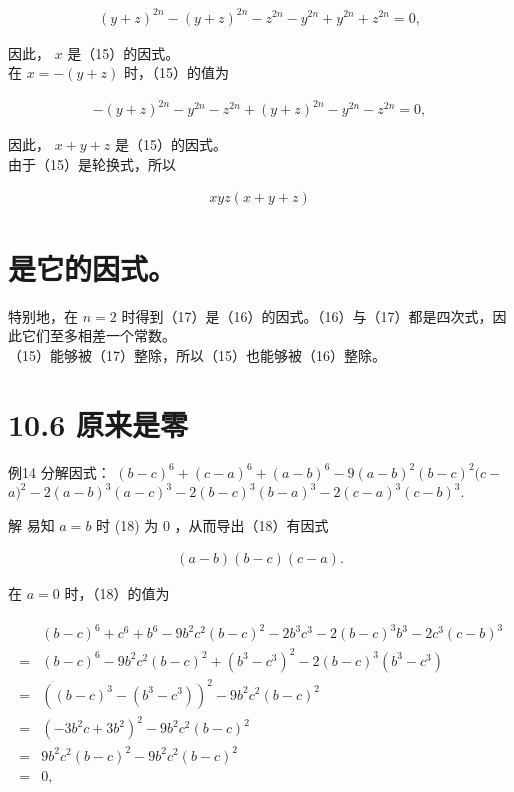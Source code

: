 \documentclass[10pt]{article}
\begin{document}
\begin{align*}
(y+z)^{2 n}-(y+z)^{2 n}-z^{2 n}-y^{2 n}+y^{2 n}+z^{2 n}=0,
\end{align*}

因此， $x$ 是（15）的因式。\\
在 $x=-(y+z)$ 时，（15）的值为

\begin{align*}
-(y+z)^{2 n}-y^{2 n}-z^{2 n}+(y+z)^{2 n}-y^{2 n}-z^{2 n}=0,
\end{align*}

因此， $x+y+z$ 是（15）的因式。\\
由于（15）是轮换式，所以

\begin{align*}
x y z(x+y+z) \tag{17}
\end{align*}

\section*{是它的因式。}
特别地，在 $n=2$ 时得到（17）是（16）的因式。（16）与（17）都是四次式，因此它们至多相差一个常数。\\
（15）能够被（17）整除，所以（15）也能够被（16）整除。

\section*{10.6 原来是零}
例14 分解因式： $(b-c)^{6}+(c-a)^{6}+(a-b)^{6}-9(a-b)^{2}(b-c)^{2}(c-$ $a)^{2}-2(a-b)^{3}(a-c)^{3}-2(b-c)^{3}(b-a)^{3}-2(c-a)^{3}(c-b)^{3}$.

解 易知 $a=b$ 时 (18) 为 0 ，从而导出（18）有因式

\begin{align*}
(a-b)(b-c)(c-a) .
\end{align*}

在 $a=0$ 时，（18）的值为

\begin{align*}
\begin{aligned}
& (b-c)^{6}+c^{6}+b^{6}-9 b^{2} c^{2}(b-c)^{2}-2 b^{3} c^{3}-2(b-c)^{3} b^{3}-2 c^{3}(c-b)^{3} \\
= & (b-c)^{6}-9 b^{2} c^{2}(b-c)^{2}+\left(b^{3}-c^{3}\right)^{2}-2(b-c)^{3}\left(b^{3}-c^{3}\right) \\
= & \left((b-c)^{3}-\left(b^{3}-c^{3}\right)\right)^{2}-9 b^{2} c^{2}(b-c)^{2} \\
= & \left(-3 b^{2} c+3 b^{2}\right)^{2}-9 b^{2} c^{2}(b-c)^{2} \\
= & 9 b^{2} c^{2}(b-c)^{2}-9 b^{2} c^{2}(b-c)^{2} \\
= & 0,
\end{aligned}
\end{align*}
\end{document}
